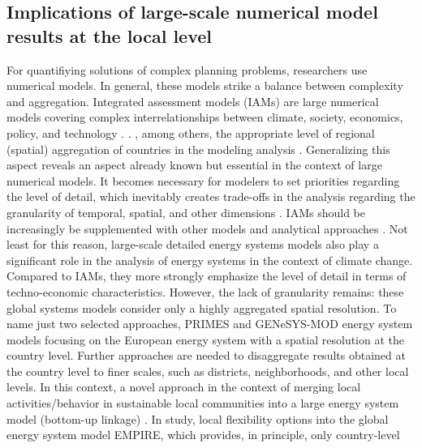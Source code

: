 \subsection{Implications of large-scale numerical model results at the local level}
For quantifiying solutions of complex planning problems, researchers use numerical models. In general, these models strike a balance between complexity and aggregation. Integrated assessment models (IAMs) are large numerical models covering complex interrelationships between climate, society, economics, policy, and technology \cite{dowlatabadi1995integrated}. . , among others, the appropriate level of regional (spatial) aggregation of countries in the modeling analysis . Generalizing this aspect reveals an aspect already known but essential in the context of large numerical models. It becomes necessary for modelers to set priorities regarding the level of detail, which inevitably creates trade-offs in the analysis regarding the granularity of temporal, spatial, and other dimensions \cite{gargiulo2013long}. IAMs should be increasingly be supplemented with other models and analytical approaches . Not least for this reason, large-scale detailed energy systems models also play a significant role in the analysis of energy systems in the context of climate change. Compared to IAMs, they more strongly emphasize the level of detail in terms of techno-economic characteristics. However, the lack of granularity remains: these global systems models consider only a highly aggregated spatial resolution. To name just two selected approaches, PRIMES\deleted{)}  and GENeSYS-MOD\deleted{)}   energy system models focusing on the European energy system with a spatial resolution at the country level. Further approaches are needed to disaggregate results obtained at the country level to finer scales, such as districts, neighborhoods, and other local levels. In this context, a novel approach in the context of merging local activities/behavior in sustainable local communities into a large energy system model (bottom-up linkage) . In  study, local flexibility options  into the global energy system model EMPIRE, which provides, in principle, only country-level 
